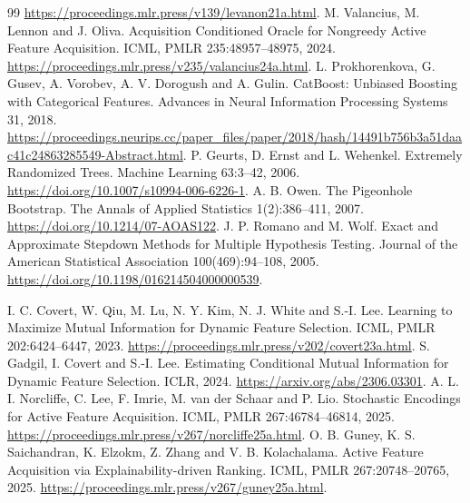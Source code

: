 \documentclass[11pt]{article}
\begin{document}
\begin{thebibliography}{99}
\url{https://proceedings.mlr.press/v139/levanon21a.html}.
 M. Valancius, M. Lennon and J. Oliva.
Acquisition Conditioned Oracle for Nongreedy Active Feature Acquisition.
ICML, PMLR 235:48957--48975, 2024.
\url{https://proceedings.mlr.press/v235/valancius24a.html}.
 L. Prokhorenkova, G. Gusev, A. Vorobev, A. V. Dorogush and A. Gulin.
CatBoost: Unbiased Boosting with Categorical Features.
Advances in Neural Information Processing Systems 31, 2018.
\url{https://proceedings.neurips.cc/paper_files/paper/2018/hash/14491b756b3a51daac41c24863285549-Abstract.html}.
 P. Geurts, D. Ernst and L. Wehenkel.
Extremely Randomized Trees. Machine Learning 63:3--42, 2006.
\url{https://doi.org/10.1007/s10994-006-6226-1}.
 A. B. Owen. The Pigeonhole Bootstrap.
The Annals of Applied Statistics 1(2):386--411, 2007.
\url{https://doi.org/10.1214/07-AOAS122}.
 J. P. Romano and M. Wolf. Exact and Approximate Stepdown
Methods for Multiple Hypothesis Testing. Journal of the American Statistical
Association 100(469):94--108, 2005.
\url{https://doi.org/10.1198/016214504000000539}.

 I. C. Covert, W. Qiu, M. Lu, N. Y. Kim, N. J. White and S.-I. Lee.
Learning to Maximize Mutual Information for Dynamic Feature Selection.
ICML, PMLR 202:6424--6447, 2023.
\url{https://proceedings.mlr.press/v202/covert23a.html}.
 S. Gadgil, I. Covert and S.-I. Lee.
Estimating Conditional Mutual Information for Dynamic Feature Selection.
ICLR, 2024. \url{https://arxiv.org/abs/2306.03301}.
 A. L. I. Norcliffe, C. Lee, F. Imrie, M. van der Schaar and P. Lio.
Stochastic Encodings for Active Feature Acquisition.
ICML, PMLR 267:46784--46814, 2025.
\url{https://proceedings.mlr.press/v267/norcliffe25a.html}.
 O. B. Guney, K. S. Saichandran, K. Elzokm, Z. Zhang and V. B. Kolachalama.
Active Feature Acquisition via Explainability-driven Ranking.
ICML, PMLR 267:20748--20765, 2025.
\url{https://proceedings.mlr.press/v267/guney25a.html}.
\end{thebibliography}
\endgroup
\end{document}
